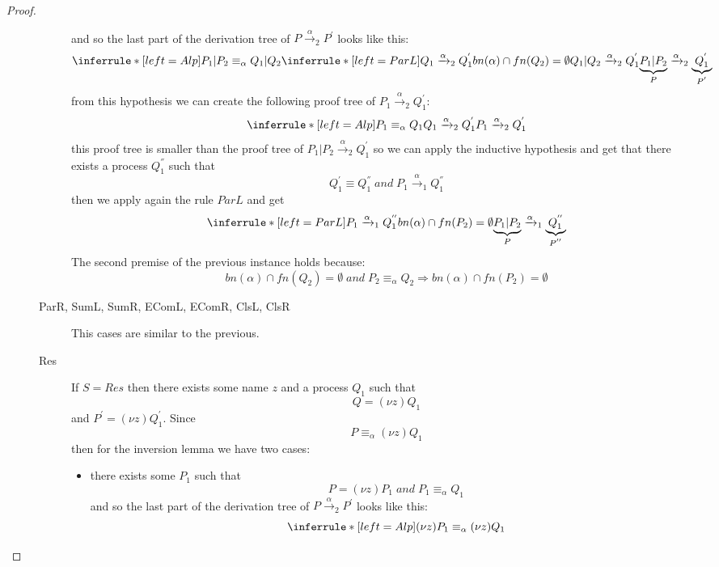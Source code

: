 \begin{theorem}
\begin{proof}
\begin{description}
\begin{description}
\[	    \]
	    and so the last part of the derivation tree of $P\xrightarrow{\alpha}_{2}P^{'}$ looks like this:
	    \[
	      \inferrule* [left=Alp]{
		  P_{1}|P_{2}\equiv_{\alpha}Q_{1}|Q_{2}
		\\
		  \inferrule* [left=ParL]{
		      Q_{1}\xrightarrow{\alpha}_{2}Q_{1}^{'}
		    \\
		      bn(\alpha)\cap fn(Q_{2})=\emptyset
		  }{
		    Q_{1}|Q_{2}\xrightarrow{\alpha}_{2}Q_{1}^{'}
		  }
	      }{
		\underbrace{P_{1}|P_{2}}_{P}\xrightarrow{\alpha}_{2}\underbrace{Q_{1}^{'}}_{P^{'}}
	      }
	    \]
	    from this hypothesis we can create the following proof tree of $P_{1}\xrightarrow{\alpha}_{2}Q_{1}^{'}$:
	    \[
	      \inferrule* [left=Alp]{
		  P_{1}\equiv_{\alpha}Q_{1}
		\\
		  Q_{1}\xrightarrow{\alpha}_{2}Q_{1}^{'}
	      }{
		P_{1}\xrightarrow{\alpha}_{2}Q_{1}^{'}
	      }
	    \]
	    this proof tree is smaller than the proof tree of $P_{1}|P_{2}\xrightarrow{\alpha}_{2}Q_{1}^{'}$ so we can apply the inductive hypothesis and get that there exists a process $Q_{1}^{''}$ such that
	    \[
	      Q_{1}^{'}\equiv Q_{1}^{''}\; and\; P_{1}\xrightarrow{\alpha}_{1}Q_{1}^{''} 
	    \]
	    then we apply again the rule $ParL$ and get 
	    \[
	      \inferrule* [left=ParL]{
		  P_{1}\xrightarrow{\alpha}_{1}Q_{1}^{''} 
		\\
		  bn(\alpha) \cap fn(P_{2})=\emptyset
	      }{
		\underbrace{P_{1}|P_{2}}_{P}\xrightarrow{\alpha}_{1}\underbrace{Q_{1}^{''}}_{P^{''}}
	      }
	    \]
	    The second premise of the previous instance holds because:
	    \[
	      bn(\alpha)\cap fn(Q_{2})=\emptyset\; and\; P_{2}\equiv_{\alpha}Q_{2}\Rightarrow bn(\alpha)\cap fn(P_{2})=\emptyset
	    \]
	  \item[ParR, SumL, SumR, EComL, EComR, ClsL, ClsR] 
	    This cases are similar to the previous.
	  \item[Res]
	    If $S=Res$ then there exists some name $z$ and a process $Q_{1}$ such that 
	    \[
	      Q=(\nu z)Q_{1}
	    \]
	    and $P^{'}=(\nu z)Q_{1}^{'}$. Since 
	    \[
	      P\equiv_{\alpha}(\nu z)Q_{1}
	    \]
	    then for the inversion lemma we have two cases:
	    \begin{itemize}
	      \item 
		there exists some $P_{1}$ such that 
		\[
		  P=(\nu z)P_{1}\; and\; P_{1}\equiv_{\alpha}Q_{1}
		\]
		and so the last part of the derivation tree of $P\xrightarrow{\alpha}_{2}P^{'}$ looks like this:
		\[
		  \inferrule* [left=Alp]{
		      (\nu z)P_{1}\equiv_{\alpha}(\nu z)Q_{1}
}\]
\end{itemize}
\end{description}
\end{description}
\end{proof}
\end{theorem}
